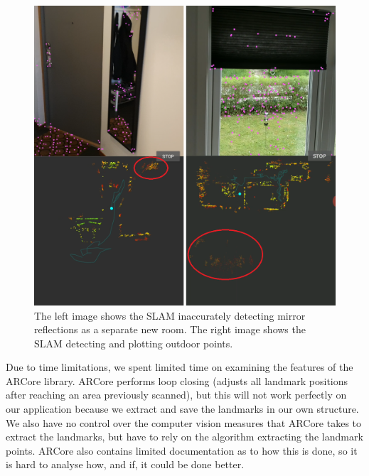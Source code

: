 \documentclass{article}
\begin{document}
\begin{figure}[!htb]
    \centering
    \includegraphics[width=0.6\linewidth]{mirror-window-examples.png}
    \caption{The left image shows the SLAM inaccurately detecting mirror reflections as a separate new room. The right image shows the SLAM detecting and plotting outdoor points.}
    \label{fig:mirror-window-examples}
\end{figure}

Due to time limitations, we spent limited time on examining the features of the ARCore library. ARCore performs loop closing (adjusts all landmark positions after reaching an area previously scanned), but this will not work perfectly on our application because we extract and save the landmarks in our own structure. We also have no control over the computer vision measures that ARCore takes to extract the landmarks, but have to rely on the algorithm extracting the landmark points. ARCore also contains limited documentation as to how this is done, so it is hard to analyse how, and if, it could be done better.





\newpage
\end{document}
